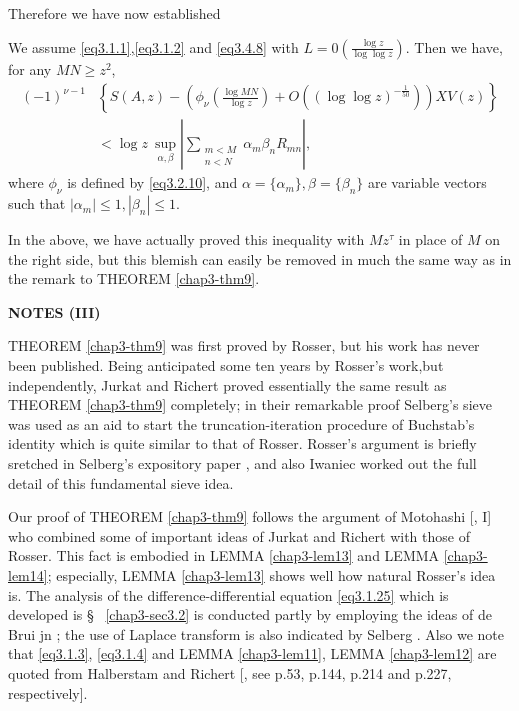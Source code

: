 Therefore we have now established
\begin{theorem} \label{chap3-thm10}
We assume \eqref{eq3.1.1},\break \eqref{eq3.1.2} and \eqref{eq3.4.8} with
  $L = 0\left(\frac{\log z}{\log \log z}\right)$. Then we have, for
  any $MN \ge z^2$,  
  \begin{align*}
    (-1)^{\nu -1} & \left\{ S(A,z)  - \left(\phi_\nu \left(\frac{\log
      MN}{\log z}\right) + O
    \left((\log \log z)^{-\frac{1}{50}}\right)\right) XV(z) \right\}\\ 
    & < \log z ~\sup\limits_{\alpha, \beta } | \sum_{\substack{m < M
        \\ n < N}} \alpha_m \beta_n R_{mn}|,  
  \end{align*}
where $\phi_\nu$ is defined by \eqref{eq3.2.10}, and $\alpha = \{\alpha_m\},
\beta = \{\beta_n\}$ are variable vectors such that $|\alpha_m | \leq
1, |\beta_n | \leq 1$. 
\end{theorem}

\begin{remark}
In the above, we have actually proved this inequality with $Mz^\tau$
in place of $M$ on the right side, but this blemish can easily be
removed in much the same way as in the remark to THEOREM \ref{chap3-thm9}. 
\end{remark}

\begin{center}
\textbf{NOTES (III)}
\end{center}

THEOREM \ref{chap3-thm9} was first proved by Rosser, but his work has
never been published. Being anticipated some ten years by Rosser's 
work,\pageoriginale but independently, Jurkat and Richert \cite{key36} proved
essentially 
the same result as THEOREM \ref{chap3-thm9} completely; in their
remarkable proof 
Selberg's sieve was used as an aid to start the truncation-iteration
procedure of Buchstab's identity which is quite similar to that of
Rosser. Rosser's argument is briefly sretched in Selberg's expository
paper \cite{key75}, and also Iwaniec \cite{key28} worked out the full detail of
this fundamental sieve idea. 

Our proof of THEOREM \ref{chap3-thm9} follows the argument of
Motohashi [\cite{key60}, I] 
who combined some of important ideas of Jurkat and Richert with those
of Rosser. This fact is embodied in LEMMA \ref{chap3-lem13} and LEMMA
\ref{chap3-lem14}; 
especially, LEMMA \ref{chap3-lem13} shows well how natural Rosser's
idea is. The analysis of the difference-differential equation
\eqref{eq3.1.25} which is 
developed is \S~ \ref{chap3-sec3.2} is conducted partly by employing
the ideas of de 
Brui jn \cite{key9}; the use of Laplace transform is also indicated by
Selberg \cite{key75}. Also we note that \eqref{eq3.1.3},
\eqref{eq3.1.4} and LEMMA \ref{chap3-lem11}, 
LEMMA \ref{chap3-lem12} are quoted from Halberstam and Richert
[\cite{key12}, see p.53, p.144, p.214 and p.227, respectively]. 

